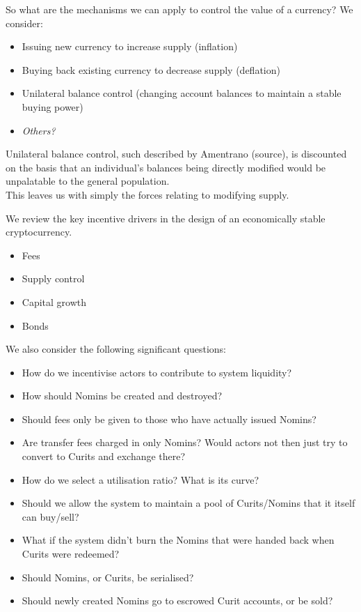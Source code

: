 \noindent So what are the mechanisms we can apply to control the value of a currency? We consider:

\begin{itemize}
    \item Issuing new currency to increase supply (inflation)
    \item Buying back existing currency to decrease supply (deflation)
    \item Unilateral balance control (changing account balances to maintain a stable buying power)
    \item \textit{Others?}
\end{itemize}

\noindent Unilateral balance control, such described by Amentrano (source), is discounted on the basis that an individual's balances being directly modified would be unpalatable to the general population. \\

This leaves us with simply the forces relating to modifying supply.

We review the key incentive drivers in the design of an economically stable cryptocurrency. \\

\begin{itemize}
	\item Fees
	\item Supply control
	\item Capital growth
	\item Bonds
\end{itemize}

\noindent We also consider the following significant questions:

\begin{itemize}
    \item How do we incentivise actors to contribute to system liquidity?
    \item How should Nomins be created and destroyed?
    \item Should fees only be given to those who have actually issued Nomins?
    \item Are transfer fees charged in only Nomins? Would actors not then just try to convert to Curits and exchange there?
    \item How do we select a utilisation ratio? What is its curve?
    \item Should we allow the system to maintain a pool of Curits/Nomins that it itself can buy/sell?
    \item What if the system didn't burn the Nomins that were handed back when Curits were redeemed?
    \item Should Nomins, or Curits, be serialised?
    \item Should newly created Nomins go to escrowed Curit accounts, or be sold?
\end{itemize}

